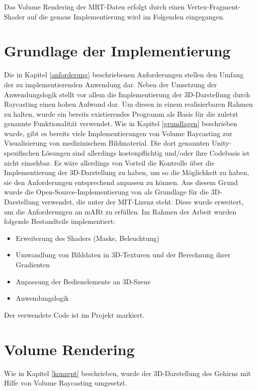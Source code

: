 Das Volume Rendering der MRT-Daten erfolgt durch einen Vertex-Fragment-Shader auf die genaue Implementierung wird im Folgenden eingegangen. 

\section{Grundlage der Implementierung}

Die in Kapitel \ref{anforderung} beschriebenen Anforderungen stellen den Umfang der zu implementierenden Anwendung dar. 
Neben der Umsetzung der Anwendungslogik stellt vor allem die Implementierung der 3D-Darstellung durch Raycasting einen hohen Aufwand dar. Um diesen in einem realisierbaren Rahmen zu halten, wurde ein bereits existierendes Programm als Basis für die zuletzt genannte Funktionalität verwendet.
Wie in Kapitel \ref{grundlagen} beschrieben wurde, gibt es bereits viele Implementierungen von Volume Raycasting zur Visualisierung von medizinischem Bildmaterial. 
Die dort genannten Unity-spezifischen Lösungen sind allerdings kostenpflichtig und/oder ihre Codebasis ist nicht einsehbar. Es wäre allerdings von Vorteil die Kontrolle über die Implementierung der 3D-Darstellung zu haben, um so die Möglichkeit zu haben, sie den Anforderungen entsprechend anpassen zu können.
Aus diesem Grund wurde die Open-Source-Implementierung von \cite{volumeRenderingGit} als Grundlage für die 3D-Darstellung verwendet, die unter der MIT-Lizenz steht. 
Diese wurde erweitert, um die Anforderungen an mARt zu erfüllen. 
Im Rahmen der Arbeit wurden folgende Bestandteile implementiert:

\begin{itemize}
\item Erweiterung des Shaders (Maske, Beleuchtung)
\item Umwandlung von Bilddaten in 3D-Texturen und der Berechnung ihrer Gradienten
\item Anpassung der Bedienelemente an 3D-Szene
\item Anwendungslogik
\end{itemize}
Der verwendete Code ist im Projekt markiert.
\section{Volume Rendering}

Wie in Kapitel \ref{konzept} beschrieben, wurde der 3D-Darstellung des Gehirns mit Hilfe von Volume Raycasting umgesetzt. 

